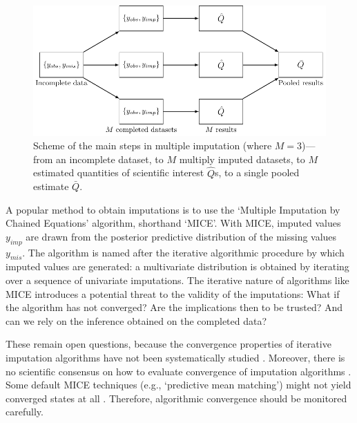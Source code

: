 \documentclass[Royal,times,sageh]{sagej}
\begin{document}
\begin{figure}

{\centering \includegraphics[width=\linewidth]{../Figures/diagram} 

}

\caption{Scheme of the main steps in multiple imputation (where $M=3$)---from an incomplete dataset, to $M$ multiply imputed datasets, to $M$ estimated quantities of scientific interest $\hat{Q}$s, to a single pooled estimate $\bar{Q}$.}\label{fig:diagram}
\end{figure}

A popular method to obtain imputations is to use the `Multiple Imputation by Chained Equations' algorithm, shorthand `MICE'\citep{mice}. With MICE, imputed values \(y_{imp}\) are drawn from the posterior predictive distribution of the missing values \(y_{mis}\). The algorithm is named after the iterative algorithmic procedure by which imputed values are generated: a multivariate distribution is obtained by iterating over a sequence of univariate imputations. The iterative nature of algorithms like MICE introduces a potential threat to the validity of the imputations: What if the algorithm has not converged? Are the implications then to be trusted? And can we rely on the inference obtained on the completed data?

These remain open questions, because the convergence properties of iterative imputation algorithms have not been systematically studied \citep{buur18}. Moreover, there is no scientific consensus on how to evaluate convergence of imputation algorithms \citep{taka17}. Some default MICE techniques (e.g., `predictive mean matching') might not yield converged states at all \citep{murr18}. Therefore, algorithmic convergence should be monitored carefully.
\end{document}
